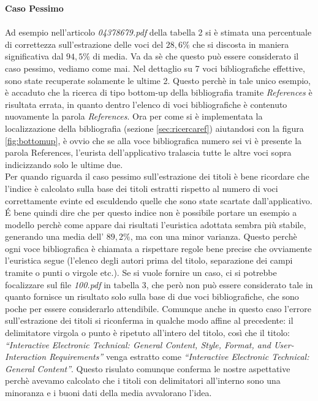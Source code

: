 \textbf{Caso Pessimo}\\
~\\
Ad esempio nell'articolo \textit{04378679.pdf} della tabella 2 si è stimata una percentuale di correttezza sull'estrazione delle voci del $28,6\%$ che si discosta in maniera significativa dal $94,5\%$ di media. Va da sè che questo può essere considerato il caso pessimo, vediamo come mai. Nel dettaglio su 7 voci bibliografiche effettive, sono state recuperate solamente le ultime 2. Questo perchè in tale unico esempio, è accaduto che la ricerca di tipo bottom-up della bibliografia tramite \textit{References} è risultata errata, in quanto dentro l'elenco di voci bibliografiche è contenuto nuovamente la parola \textit{References}. Ora per come si è implementata la localizzazione della bibliografia (sezione \ref{sec:ricercaref}) aiutandosi con la figura \ref{fig:bottomup}, è ovvio che se alla voce bibliografica numero sei vi è presente la parola References, l'eurista dell'applicativo tralascia tutte le altre voci sopra indicizzando solo le ultime due.\\
	
Per quando riguarda il caso pessimo sull'estrazione dei titoli è bene ricordare che l'indice è calcolato sulla base dei titoli estratti rispetto al numero di voci correttamente evinte ed esculdendo quelle che sono state scartate dall'applicativo. \'E bene quindi dire che per questo indice non è possibile portare un esempio a modello perchè come appare dai risultati l'euristica adottata sembra più stabile, generando una media dell' $89,2\%$, ma con una minor varianza. Questo perchè ogni voce bibliografica è chiamata a rispettare regole bene precise che ovviamente l'euristica segue (l'elenco degli autori prima del titolo, separazione dei campi tramite o punti o virgole etc.). Se si vuole fornire un caso, ci si potrebbe focalizzare sul file \textit{100.pdf} in tabella 3, che però non può essere considerato tale in quanto fornisce un risultato solo sulla base di due voci bibliografiche, che sono poche per essere considerarlo attendibile. Comunque anche in questo caso l'errore sull'estrazione dei titoli si riconferma in qualche modo affine al precedente: il delimitatore virgola o punto è ripetuto all'intero del titolo, così che il titolo: \textit{``Interactive Electronic Technical: General Content, Style, Format, and User-Interaction Requirements''} venga estratto come \textit{``Interactive Electronic Technical: General Content''}. Questo risulato comunque conferma le nostre aspettative perchè avevamo calcolato che i titoli con delimitatori all'interno sono una minoranza e i buoni dati della media avvalorano l'idea.\\ 

